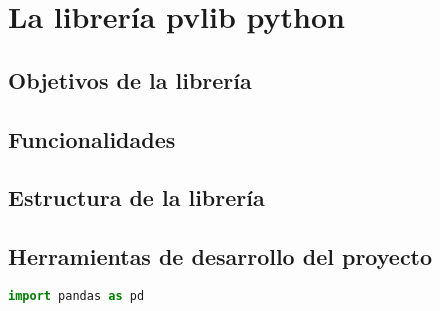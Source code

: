 \chapter{La librería pvlib python} \label{chp:pvlib}

\section{Objetivos de la librería} \label{sct:pvlib:objetivos}

\section{Funcionalidades} \label{sct:pvlib:funcionalidades}

\section{Estructura de la librería} \label{sct:pvlib:estructura}

\section{Herramientas de desarrollo del proyecto} \label{sct:pvlib:herramientas}

\begin{lstlisting}[language=Python]
import pandas as pd

\end{lstlisting}
